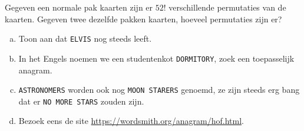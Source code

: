 \documentclass[12pt,a4paper,twoside]{article}
\begin{document}
\begin{oefening} %
Gegeven een normale pak kaarten zijn er $52!$ verschillende permutaties van de kaarten. Gegeven twee dezelfde pakken kaarten, hoeveel permutaties zijn er?
\end{oefening}

\begin{oefening}
  \begin{enumerate}[(a)]
  \item Toon aan dat \texttt{ELVIS} nog steeds leeft.
  \item In het Engels noemen we een studentenkot \texttt{DORMITORY}, zoek een toepasselijk anagram.
  \item \texttt{ASTRONOMERS} worden ook nog \texttt{MOON STARERS} genoemd, ze zijn steeds erg bang dat er \texttt{NO MORE STARS} zouden zijn.
  \item Bezoek eens de site \url{https://wordsmith.org/anagram/hof.html}.
  \end{enumerate}
\end{oefening}
\end{document}
